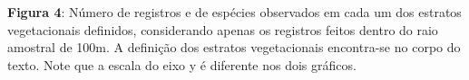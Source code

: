 \textbf{Figura 4}: Número de registros e de espécies observados em cada um dos estratos vegetacionais definidos, considerando apenas os registros feitos dentro do raio amostral de 100m. A definição dos estratos vegetacionais encontra-se no corpo do texto. Note que a escala do eixo y é diferente nos dois gráficos.